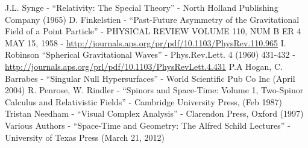 \documentclass[floatfix,aps,prd,amsmath,amssymb]{revtex4}
\begin{document}
\begin{thebibliography}{10}
J.L. Synge - ``Relativity: The Special Theory'' - North Holland Publishing Company (1965)
D. Finkelstien - ``Past-Future Asymmetry of the Gravitational Field of a Point Particle'' - PHYSICAL REVIEW VOLUME 110, NUM B ER 4 MAY 15, 1958 - \url{http://journals.aps.org/pr/pdf/10.1103/PhysRev.110.965}
I. Robinson ``Spherical Gravitational Waves'' - Phys.Rev.Lett. 4 (1960) 431-432 - \url{http://journals.aps.org/prl/pdf/10.1103/PhysRevLett.4.431}
P.A Hogan, C. Barrabes - ``Singular Null Hypersurfaces'' - World Scientific Pub Co Inc (April 2004)
R. Penrose, W. Rindler - ``Spinors and Space-Time: Volume 1, Two-Spinor Calculus and Relativistic Fields'' - Cambridge University Press, (Feb 1987)
Tristan Needham - ``Visual Complex Analysis'' - Clarendon Press, Oxford (1997)
Various Authors - ``Space-Time and Geometry: The Alfred Schild Lectures'' - University of Texas Press (March 21, 2012)
\end{thebibliography}
\end{document}
